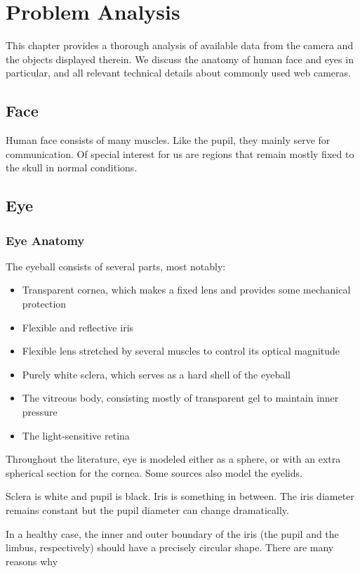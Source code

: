 \chapter{Problem Analysis}

This chapter provides a thorough analysis of available data from the camera and the objects displayed therein.
We discuss the anatomy of human face and eyes in particular, and all relevant technical details about commonly used web cameras.

\section{Face}

Human face consists of many muscles.
Like the pupil, they mainly serve for communication.
Of special interest for us are regions that remain mostly fixed to the skull in normal conditions.

\section{Eye}
\subsection{Eye Anatomy}

The eyeball consists of several parts, most notably:
\begin{itemize}
\item Transparent cornea, which makes a fixed lens and provides some mechanical protection
\item Flexible and reflective iris
\item Flexible lens stretched by several muscles to control its optical magnitude
\item Purely white sclera, which serves as a hard shell of the eyeball
\item The vitreous body, consisting mostly of transparent gel to maintain inner pressure
\item The light-sensitive retina
\end{itemize}

Throughout the literature, eye is modeled either as a sphere, or with an extra spherical section for the cornea.
Some sources also model the eyelids.

Sclera is white and pupil is black.
Iris is something in between.
The iris diameter remains constant but the pupil diameter can change dramatically.

In a healthy case, the inner and outer boundary of the iris (the pupil and the limbus, respectively) should have a precisely circular shape.
There are many reasons why 

